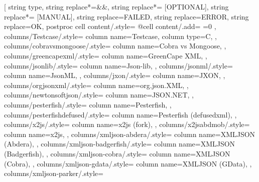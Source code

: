 \usepackage{colortbl}
\usepackage{makecell}
\usepackage{booktabs}
\usepackage{threeparttable}
\usepackage{pifont}
\newcommand{\cmark}{\ding{51}}%
\newcommand{\xmark}{\ding{55}}%
\usepackage[T1]{fontenc}
\usepackage{rubfonts2009}

  \begin{threeparttable}
\setlength{\tabcolsep}{1.25mm}
\pgfplotstabletypeset[
    string type,
    string replace*={&}{\&},
    string replace*={ [OPTIONAL]}{},
    string replace*={ [MANUAL]}{},
    string replace={FAILED}{},
    string replace={ERROR}{\xmark},
    string replace={OK}{\cmark},
    postproc cell content/.style={%
        @cell content/.add={
            \ifnum{}=0
                \color{white}
            \fi
           }{}
    },
    columns/Testcase/.style={
        column name=Testcase,
        column type={C},
    },
    columns/cobravsmongoose/.style={
        column name={Cobra vs Mongoose},
    },
    columns/greencapexml/.style={
        column name={GreenCape XML},
    },
    columns/jsonlib/.style={
        column name={Json-lib},
    },
    columns/jsonml/.style={
        column name={JsonML},
    },
    columns/jxon/.style={
        column name={JXON},
    },
    columns/orgjsonxml/.style={
        column name={org.json.XML},
    },
    columns/newtonsoftjson/.style={
        column name={JSON.NET},
    },
    columns/pesterfish/.style={
        column name={Pesterfish},
    },
    columns/pesterfishdefused/.style={
        column name={Pesterfish (defusedxml)},
    },
    columns/x2js/.style={
        column name={x2js (fork)},
    },
    columns/x2jsabdmob/.style={
        column name=x2js,
    },
    columns/xmljson-abdera/.style={
        column name=XMLJSON (Abdera),
    },
    columns/xmljson-badgerfish/.style={
        column name=XMLJSON (Badgerfish),
    },
    columns/xmljson-cobra/.style={
        column name=XMLJSON (Cobra),
    },
    columns/xmljson-gdata/.style={
        column name=XMLJSON (GData),
    },
    columns/xmljson-parker/.style={
}
\end{threeparttable}
